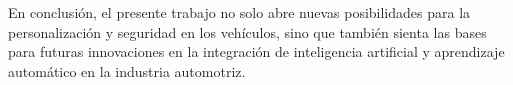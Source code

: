 \documentclass[12pt]{report} %
\begin{document}
En conclusión, el presente trabajo no solo abre nuevas posibilidades para la personalización y seguridad en los vehículos, sino que también sienta las bases para futuras innovaciones en la integración de inteligencia artificial y aprendizaje automático en la industria automotriz.





\clearpage
{}
\printbibliography




\end{document}
